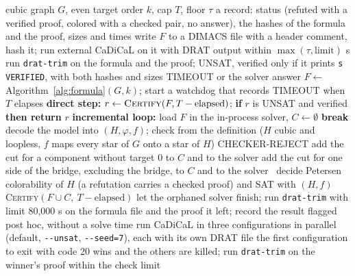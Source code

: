 \documentclass[11pt]{article}
\theoremstyle{definition}
\theoremstyle{remark}
\begin{document}
\begin{algorithm}[!htbp]
\caption{Certification pipeline for one instance $(G,k)$ with time cap $T = 21{,}600$ s and floor $\tau = 600$ s. External runs use CaDiCaL with DRAT output followed by \texttt{drat-trim}; the in-process solver is the CaDiCaL 1.9.5 build of PySAT and is not part of the trusted base.}\label{alg:certify}
\begin{algorithmic}[1]
\Require cubic graph $G$, even target order $k$, cap $T$, floor $\tau$
\Ensure a record: status (refuted with a verified proof, colored with a checked pair, no answer), the hashes of the formula and the proof, sizes and times
  \State write $F$ to a DIMACS file with a header comment, hash it; run external CaDiCaL on it with DRAT output within $\max(\tau, \text{limit})$ s
   run \texttt{drat-trim} on the formula and the proof; \Return UNSAT, verified only if it prints \texttt{s VERIFIED}, with both hashes and sizes
  \EndIf
  \State \Return TIMEOUT or the solver answer
\EndProcedure
\State $F \gets$ Algorithm~\ref{alg:formula}$(G,k)$; start a watchdog that records TIMEOUT when $T$ elapses
\State \textbf{direct step:} $r \gets \textsc{Certify}(F, T - \text{elapsed})$; \textbf{if} $r$ is UNSAT and verified \textbf{then return} $r$
\State \textbf{incremental loop:} load $F$ in the in-process solver, $C \gets \emptyset$
\Loop
   \textbf{break}\EndIf
  \State decode the model into $(H,\varphi,f)$; check from the definition ($H$ cubic and loopless, $f$ maps every star of $G$ onto a star of $H$)
   \Return CHECKER-REJECT\EndIf
   add the cut for a component without target 0 to $C$ and to the solver
   add the cut for one side of the bridge, excluding the bridge, to $C$ and to the solver
  \Else\ decide Petersen colorability of $H$ (a refutation carries a checked proof) and \Return SAT with $(H,f)$
  \EndIf
\EndLoop
\State \Return \textsc{Certify}$(F \cup C,\ T - \text{elapsed})$
  \State let the orphaned solver finish; run \texttt{drat-trim} with limit 80{,}000 s on the formula file and the proof it left; record the result flagged post hoc, without a solve time
\EndProcedure
{}
  \State run CaDiCaL in three configurations in parallel (default, \texttt{-{}-unsat}, \texttt{-{}-seed=7}), each with its own DRAT file
  \State the first configuration to exit with code 20 wins and the others are killed; run \texttt{drat-trim} on the winner's proof within the check limit
\EndProcedure
\end{algorithmic}
\end{algorithm}
\end{document}
